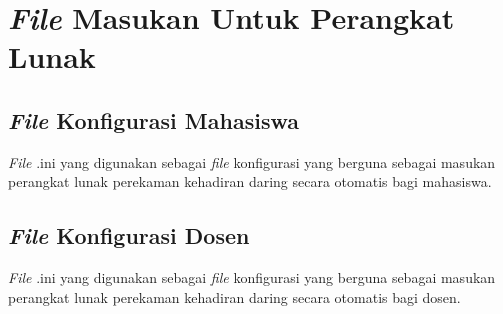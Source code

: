 \chapter{\textit{File} Masukan Untuk Perangkat Lunak}
\label{lamp:A}

%
%
%
\section{\textit{File} Konfigurasi Mahasiswa}
\textit{File} .ini yang digunakan sebagai \textit{file} konfigurasi yang berguna sebagai masukan perangkat lunak perekaman kehadiran daring secara otomatis bagi mahasiswa.
 

\section{\textit{File} Konfigurasi Dosen}
\textit{File} .ini yang digunakan sebagai \textit{file} konfigurasi yang berguna sebagai masukan perangkat lunak perekaman kehadiran daring secara otomatis bagi dosen.
 

